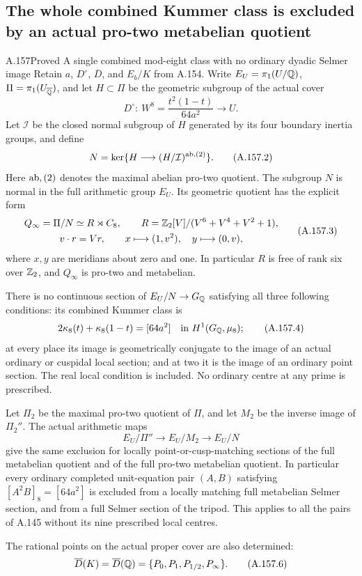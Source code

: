 \subsection{The whole combined Kummer class is excluded by an actual pro-two metabelian quotient}

\begin{statement}{A.157}{Proved}
{A single combined mod-eight class with no ordinary dyadic Selmer image}
Retain \(a\), \(D^\circ\), \(\overline D\), and \(E_b/K\)
from A.154.  Write \(E_U=\pi_1(U/\mathbb Q)\),
\(\Pi=\pi_1(U_{\overline{\mathbb Q}})\), and let
\(H\subset\Pi\) be the geometric subgroup of the actual cover
\[
 D^\circ:\ W^8=\frac{t^2(1-t)}{64a^2}\longrightarrow U.
\tag{A.157.1}
\]
Let \(\mathcal I\) be the closed normal subgroup of \(H\)
generated by its four boundary inertia groups, and define
\[
 N=\ker\{H\longrightarrow(H/\mathcal I)^{\rm ab,(2)}\}.
\tag{A.157.2}
\]
Here \({\rm ab,(2)}\) denotes the maximal abelian pro-two
quotient.  The subgroup \(N\) is normal in the full arithmetic
group \(E_U\).  Its geometric quotient has the explicit form
\[
 \begin{gathered}
 Q_\infty=\Pi/N\simeq
       R\rtimes C_8,\qquad
 R=\mathbb Z_2[V]/(V^6+V^4+V^2+1),\\
 v\cdot r=Vr,\qquad
 x\longmapsto(1,v^2),\quad y\longmapsto(0,v),
 \end{gathered}
\tag{A.157.3}
\]
where \(x,y\) are meridians about zero and one.
In particular \(R\) is free of rank six over \(\mathbb Z_2\),
and \(Q_\infty\) is pro-two and metabelian.

There is no continuous section of \(E_U/N\to G_\mathbb Q\)
satisfying all three following conditions: its combined
Kummer class is
\[
          2\kappa_8(t)+\kappa_8(1-t)=[64a^2]
                            \quad\text{in }H^1(G_\mathbb Q,\mu_8);
\tag{A.157.4}
\]
at every place its image is geometrically conjugate to
the image of an actual ordinary or cuspidal local
section; and at two it is the image of an ordinary
point section.  The real local condition is included.
No ordinary centre at any prime is prescribed.

Let \(\Pi_2\) be the maximal pro-two quotient of \(\Pi\),
and let \(M_2\) be the inverse image of \(\Pi_2''\).
The actual arithmetic maps
\[
 E_U/\Pi''\longrightarrow E_U/M_2
                         \longrightarrow E_U/N
\tag{A.157.5}
\]
give the same exclusion for locally point-or-cusp-matching
sections of the full metabelian quotient and of the
full pro-two metabelian quotient.  In particular every
ordinary completed unit-equation pair \((A,B)\) satisfying
\([A^2B]_8=[64a^2]\) is excluded from a locally matching
full metabelian Selmer section, and from a full Selmer
section of the tripod.  This applies to all the pairs
of A.145 without its nine prescribed local centres.

The rational points on the actual proper cover are also
determined:
\[
        \overline D(K)=\overline D(\mathbb Q)
             =\{P_0,P_1,P_{1/2},P_\infty\}.
\tag{A.157.6}
\]
\end{statement}

